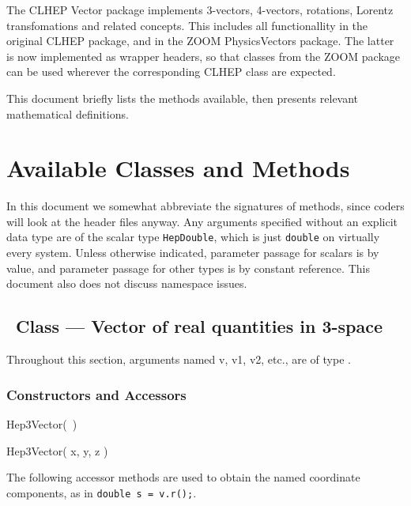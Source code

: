 \author{
Fermilab ``ZOOM'' Physics Class Library Task Force}
\date{Version 2.3, September 2, 2003}
\maketitle

The CLHEP Vector package implements 3-vectors, 4-vectors, rotations, 
Lorentz transfomations and related concepts.  
This includes all functionallity in the original CLHEP package, and in
the ZOOM PhysicsVectors package.  
The latter is now implemented as wrapper headers, so that classes from
the ZOOM package can be used wherever the corresponding CLHEP class are
expected.

This document briefly lists the methods available, then presents relevant
mathematical definitions. 

\tableofcontents

\section{Available Classes and Methods}

In this document we somewhat abbreviate the signatures of methods,
since coders will look at the header files anyway.  
Any arguments specified without an explicit data type
are of the scalar type {\tt HepDouble}, which is just {\tt double} on
virtually every system.
Unless otherwise indicated,
parameter passage for scalars is by value,
and parameter passage for other types is by constant reference.
This document also does not discuss namespace issues.

\subsection{\protect\SV\ Class --- Vector of real quantities in 3-space}

Throughout this section,
arguments named v, v1, v2, etc., are of type \SV .

\subsubsection{Constructors and Accessors}

\begin{shortlist}
  \item Hep3Vector(~)
  \item Hep3Vector( x, y, z ) 
\end{shortlist}

\noindent
The following accessor methods are used
to obtain the named coordinate components,
as in \verb|double s = v.r();|.

